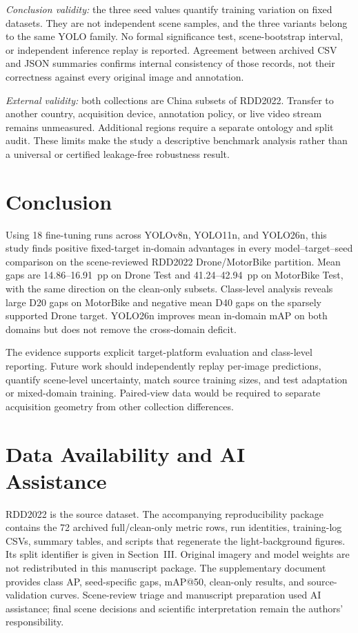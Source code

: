 \documentclass[conference,a4paper]{IEEEtran}
\begin{document}
\emph{Conclusion validity:} the three seed values quantify training variation on fixed datasets. They are not independent scene samples, and the three variants belong to the same YOLO family. No formal significance test, scene-bootstrap interval, or independent inference replay is reported. Agreement between archived CSV and JSON summaries confirms internal consistency of those records, not their correctness against every original image and annotation.

\emph{External validity:} both collections are China subsets of RDD2022. Transfer to another country, acquisition device, annotation policy, or live video stream remains unmeasured. Additional regions require a separate ontology and split audit. These limits make the study a descriptive benchmark analysis rather than a universal or certified leakage-free robustness result.

\section{Conclusion}
Using 18 fine-tuning runs across YOLOv8n, YOLO11n, and YOLO26n, this study finds positive fixed-target in-domain advantages in every model--target--seed comparison on the scene-reviewed RDD2022 Drone/MotorBike partition. Mean gaps are 14.86--16.91~pp on Drone Test and 41.24--42.94~pp on MotorBike Test, with the same direction on the clean-only subsets. Class-level analysis reveals large D20 gaps on MotorBike and negative mean D40 gaps on the sparsely supported Drone target. YOLO26n improves mean in-domain mAP on both domains but does not remove the cross-domain deficit.

The evidence supports explicit target-platform evaluation and class-level reporting. Future work should independently replay per-image predictions, quantify scene-level uncertainty, match source training sizes, and test adaptation or mixed-domain training. Paired-view data would be required to separate acquisition geometry from other collection differences.

\section*{Data Availability and AI Assistance}
RDD2022 is the source dataset\cite{arya2024rdd2022}. The accompanying reproducibility package contains the 72 archived full/clean-only metric rows, run identities, training-log CSVs, summary tables, and scripts that regenerate the light-background figures. Its split identifier is given in Section~III. Original imagery and model weights are not redistributed in this manuscript package. The supplementary document provides class AP, seed-specific gaps, mAP@50, clean-only results, and source-validation curves. Scene-review triage and manuscript preparation used AI assistance; final scene decisions and scientific interpretation remain the authors' responsibility.

\balance


\end{document}
